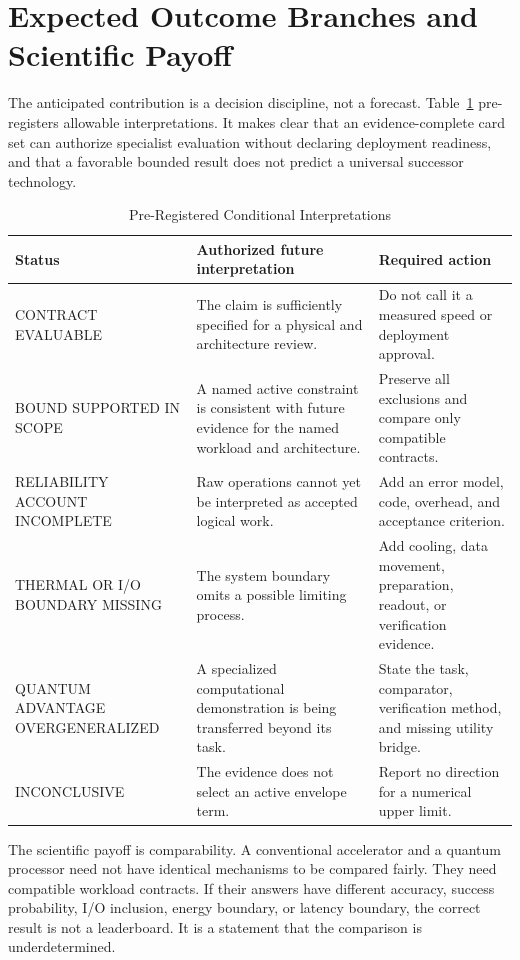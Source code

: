 \documentclass[conference]{IEEEtran}
\begin{document}
\section{Expected Outcome Branches and Scientific Payoff}

The anticipated contribution is a decision discipline, not a forecast.
Table~\ref{tab:outcomes} pre-registers allowable interpretations. It makes
clear that an evidence-complete card set can authorize specialist evaluation
without declaring deployment readiness, and that a favorable bounded result
does not predict a universal successor technology.

\begin{table}[t]
\caption{Pre-Registered Conditional Interpretations}
\label{tab:outcomes}
\centering
\footnotesize
\begin{tabular}{p{}p{}p{}}
\toprule
Status & Authorized future interpretation & Required action\\
\midrule
CONTRACT EVALUABLE & The claim is sufficiently specified for a physical and architecture review. & Do not call it a measured speed or deployment approval.\\
BOUND SUPPORTED IN SCOPE & A named active constraint is consistent with future evidence for the named workload and architecture. & Preserve all exclusions and compare only compatible contracts.\\
RELIABILITY ACCOUNT INCOMPLETE & Raw operations cannot yet be interpreted as accepted logical work. & Add an error model, code, overhead, and acceptance criterion.\\
THERMAL OR I/O BOUNDARY MISSING & The system boundary omits a possible limiting process. & Add cooling, data movement, preparation, readout, or verification evidence.\\
QUANTUM ADVANTAGE OVERGENERALIZED & A specialized computational demonstration is being transferred beyond its task. & State the task, comparator, verification method, and missing utility bridge.\\
INCONCLUSIVE & The evidence does not select an active envelope term. & Report no direction for a numerical upper limit.\\
\bottomrule
\end{tabular}
\end{table}

The scientific payoff is comparability. A conventional accelerator and a
quantum processor need not have identical mechanisms to be compared fairly.
They need compatible workload contracts. If their answers have different
accuracy, success probability, I/O inclusion, energy boundary, or latency
boundary, the correct result is not a leaderboard. It is a statement that
the comparison is underdetermined.
\end{document}
